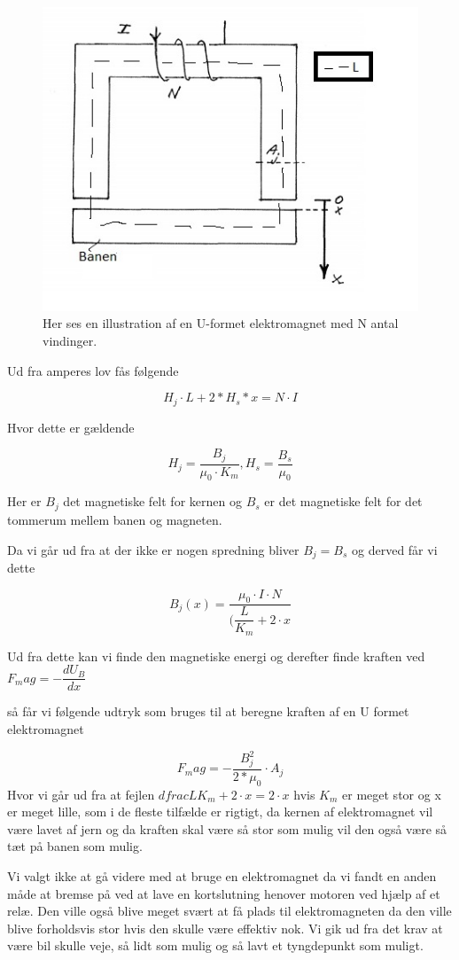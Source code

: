 \begin{figure}[h]

	\centering
		\includegraphics[scale=0.8]{Billeder/elektromagnet.jpg}
	\caption{Her ses en illustration af en U-formet elektromagnet med N antal vindinger.}
	\label{fig:elektromagnet}
\end{figure}

Ud fra amperes lov fås følgende


$$H_j \cdot L+2*H_s*x = N \cdot I$$

Hvor dette er gældende

$$H_j = \dfrac{B_j}{\mu_0 \cdot K_m}, H_s = \dfrac{B_s}{\mu_0}$$

Her er $B_j$ det magnetiske felt for kernen og $B_s$ er det magnetiske felt for det tommerum mellem banen og magneten.

Da vi går ud fra at der ikke er nogen spredning bliver $B_j = B_s$ og derved får vi dette


$$B_j(x) = \dfrac{\mu_0 \cdot I \cdot N}{(\dfrac{L}{K_m}+2 \cdot x}$$

Ud fra dette kan vi finde den magnetiske energi og derefter finde kraften ved $F_mag = -\dfrac{dU_B}{dx}$

så får vi følgende udtryk som bruges til at beregne kraften af en U formet elektromagnet

\begin{equation}
F_mag = - \dfrac{B_j^2}{2*\mu_0} \cdot A_j
\end{equation}
Hvor vi går ud fra at fejlen $dfrac{L}{K_m}+2 \cdot x = 2 \cdot x$ hvis $K_m$ er meget stor og x er meget lille, som i de fleste tilfælde er rigtigt, da kernen af elektromagnet vil være lavet af jern og da kraften skal være så stor som mulig vil den også være så tæt på banen som mulig.

Vi valgt ikke at gå videre med at bruge en elektromagnet da vi fandt en anden måde at bremse på ved at lave en kortslutning henover motoren ved hjælp af et relæ. Den ville også blive meget svært at få plads til elektromagneten da den ville blive forholdsvis stor hvis den skulle være effektiv nok. Vi gik ud fra det krav at være bil skulle veje, så lidt som mulig og så lavt et tyngdepunkt som muligt. 
